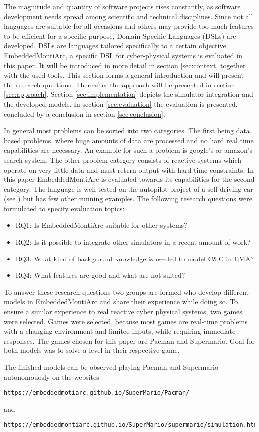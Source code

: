 The magnitude and quantity of software projects rises constantly, as software development needs spread among scientific and technical disciplines. Since not all languages are suitable for all occasions and others may provide too much features to be efficient for a specific purpose, Domain Specific Languages (DSLs) are developed. DSLs are languages tailored specifically to a certain objective.
EmbeddedMontiArc, a specific DSL for cyber-physical systems is evaluated in this paper. It will be introduced in more detail in section \ref{sec:context} together with the used tools. This section forms a general introduction and will present the research questions.
Thereafter the approach will be presented in section \ref{sec:approach}. Section \ref{sec:implementation} depicts the simulator integration and the developed models. In section \ref{sec:evaluation} the evaluation is presented, concluded by a conclusion in section \ref{sec:conclusion}.

In general most problems can be sorted into two categories. The first being data based problems, where huge amounts of data are processed and no hard real time capabilities are necessary. An example for such a problem is google's or amazon's search system. The other problem category consists of reactive systems which operate on very little data and must return output with hard time constraints. In this paper EmbeddedMontiArc is evaluated towards its capabilities for the second category. The language is well tested on the autopilot project of a self driving car (see \cite{emademo}) but has few other running examples.
The following research questions were formulated to specify evaluation topics:

\begin{itemize}
	\item RQ1: Is EmbeddedMontiArc suitable for other systems?
	\item RQ2: Is it possible to integrate other simulators in a recent amount of work?
	\item RQ3: What kind of background knowledge is needed to model C\&C in EMA?
	\item RQ4: What features are good and what are not suited?
\end{itemize}

To answer these research questions two groups are formed who develop different models in EmbeddedMontiArc and share their experience while doing so. To ensure a similar experience to real reactive cyber physical systems, two games were selected.
Games were selected, because most games are real-time problems with a changing environment and limited inputs, while requiring immediate responses.
The games chosen for this paper are Pacman and Supermario. Goal for both models was to solve a level in their respective game.

The finished models can be observed playing Pacman and Supermario autonomouosly on the websites 
\begin{lstlisting}
https://embeddedmotiarc.github.io/SuperMario/Pacman/
\end{lstlisting}
\cite{pacmanmodel}
and
\begin{lstlisting}
https://embeddedmontiarc.github.io/SuperMario/supermario/simulation.html
\end{lstlisting}
\cite{mariomodel}